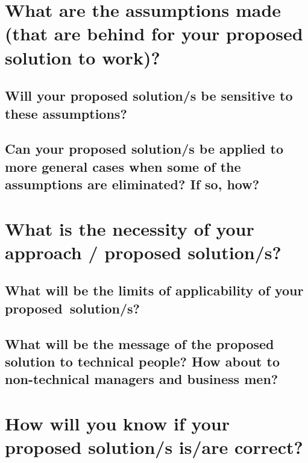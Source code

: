 \blindtext
	
	
	
	
	
	
\section{What are the assumptions made (that are behind for your proposed solution to work)?}
	
\blindtext
		
	
\subsection{Will your proposed solution/s be sensitive to these assumptions?}
	
\blindtext

  
\subsection{Can your proposed solution/s be applied to more general cases when some of the assumptions are eliminated? If so, how?}

\blindtext






\section{What is the necessity of your approach / proposed solution/s?}

\blindtext
	
\subsection{What will be the limits of applicability of your proposed~solution/s?}

\blindtext
					  
\subsection{What will be the message of the proposed solution to technical people?  How about to non-technical managers and business men?}
			
\blindtext





\section{How will you know if your proposed solution/s is/are correct?}

